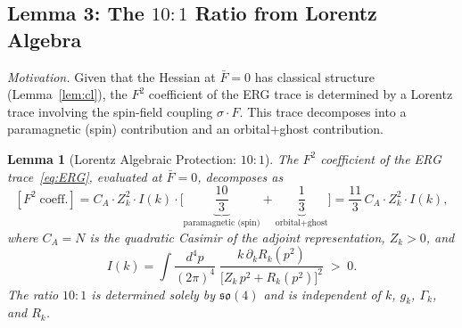 \documentclass[12pt,a4paper]{article}
\theoremstyle{plain}
\newtheorem{lemma}[theorem]{Lemma}
\theoremstyle{definition}
\theoremstyle{remark}
\begin{document}
\subsection{Lemma 3: The $10{:}1$ Ratio from Lorentz Algebra}\label{sec:lemma3}

\textit{Motivation.} Given that the Hessian at $\bar{F}=0$ has classical structure (Lemma~\ref{lem:cl}), the $F^2$ coefficient of the ERG trace is determined by a Lorentz trace involving the spin-field coupling $\sigma\cdot F$. This trace decomposes into a paramagnetic (spin) contribution and an orbital$+$ghost contribution.

\begin{lemma}[Lorentz Algebraic Protection: $10{:}1$]\label{lem:101}
The $F^2$ coefficient of the ERG trace~\eqref{eq:ERG}, evaluated at $\bar{F}=0$, decomposes as
\begin{equation}\label{eq:F2decomp}
[F^2\;\text{coeff.}] = C_A\cdot Z_k^2\cdot I(k)\cdot\bigg[\underbrace{\frac{10}{3}}_{\text{paramagnetic (spin)}} + \underbrace{\frac{1}{3}}_{\text{orbital}+\text{ghost}}\bigg] = \frac{11}{3}\,C_A\cdot Z_k^2\cdot I(k),
\end{equation}
where $C_A=N$ is the quadratic Casimir of the adjoint representation, $Z_k>0$, and
\begin{equation}\label{eq:Ik}
I(k) = \int\frac{d^4p}{(2\pi)^4}\;\frac{k\,\partial_k R_k(p^2)}{\big[Z_k\,p^2 + R_k(p^2)\big]^2} \;>\; 0.
\end{equation}
The ratio $10{:}1$ is determined solely by $\mathfrak{so}(4)$ and is independent of $k$, $g_k$, $\Gamma_k$, and $R_k$.
\end{lemma}
\end{document}
